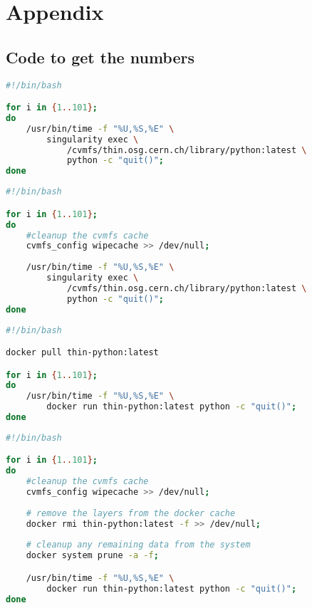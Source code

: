 \chapter{Appendix}\label{ch:Appendix}


\section{Code to get the numbers}\label{sec:benchmark-code}


\begin{lstlisting}[language=bash,
    caption={Script used to capture the startup time of singularity with image hostes in CVMFS using CVMFS cache}]
#!/bin/bash

for i in {1..101}; 
do 
    /usr/bin/time -f "%U,%S,%E" \
        singularity exec \
            /cvmfs/thin.osg.cern.ch/library/python:latest \
            python -c "quit()"; 
done
\end{lstlisting}


\begin{lstlisting}[language=bash,
    caption={Script used to capture the startup time of singularity with image hostes in CVMFS without cache}]
#!/bin/bash

for i in {1..101}; 
do 
    #cleanup the cvmfs cache
    cvmfs_config wipecache >> /dev/null; 
    
    /usr/bin/time -f "%U,%S,%E" \
        singularity exec \
            /cvmfs/thin.osg.cern.ch/library/python:latest \
            python -c "quit()"; 
done
\end{lstlisting}


\begin{lstlisting}[language=bash,
    caption={Script used to capture the startup time of docker thin-images using both CVMFS and Docker cache}]
#!/bin/bash

docker pull thin-python:latest

for i in {1..101}; 
do 
    /usr/bin/time -f "%U,%S,%E" \
        docker run thin-python:latest python -c "quit()"; 
done
\end{lstlisting}



\begin{lstlisting}[language=bash,
    caption={Script used to capture the startup time of docker thin-images without Docker nor CVMFS cache}]
#!/bin/bash

for i in {1..101}; 
do 
    #cleanup the cvmfs cache
    cvmfs_config wipecache >> /dev/null; 
    
    # remove the layers from the docker cache
    docker rmi thin-python:latest -f >> /dev/null; 
    
    # cleanup any remaining data from the system
    docker system prune -a -f; 

    /usr/bin/time -f "%U,%S,%E" \
        docker run thin-python:latest python -c "quit()"; 
done
\end{lstlisting}




